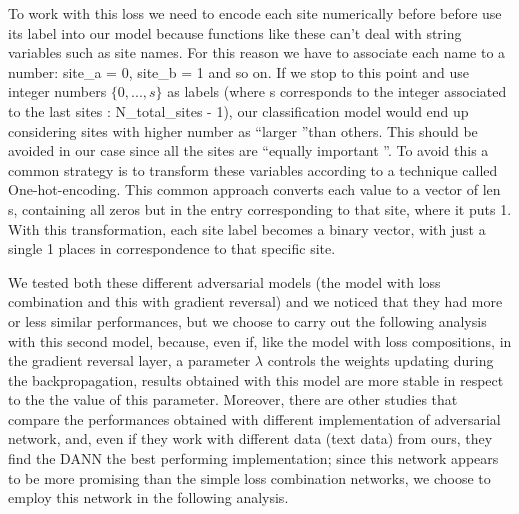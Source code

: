 \documentclass[11pt]{report}
\begin{document}

\begin{notes}
\item To work with this loss we need to encode each site numerically before before use its label into our model because functions like these can't deal with string variables such as site names. For this reason we have to associate each name to a number: site\_a = 0, site\_b = 1 and so on. If we stop to this point and use integer numbers $\{0, ..., s\}$ as labels (where s corresponds to the integer associated to the last sites : N\_total\_sites - 1), our classification model would end up considering sites with higher number as \textquotedblleft larger \textquotedblright than others. This should be avoided in our case since all the sites are \textquotedblleft equally important \textquotedblright. %
To avoid this a common strategy is to transform these variables according to a technique called One-hot-encoding.
This common approach converts each value to a vector of len s, containing all zeros but in the entry corresponding to that site, where it puts 1. With this transformation, each site label becomes a binary vector, with just a single 1 places in correspondence to that specific site.
\end{notes}


We tested both these different adversarial models (the model with loss combination and this with gradient reversal) and we noticed that they had more or less similar performances, but we choose to carry out the following analysis with this second model, because, even if, like the model with loss compositions, in the gradient reversal layer, a parameter $\lambda$ controls the weights updating during the backpropagation, results obtained with this model are more stable in respect to the the value of this parameter.
Moreover, there are other studies \cite{kamath2019} that compare the performances obtained with different implementation of adversarial network, and, even if they work with different data (text data) from ours, they find the DANN the best performing implementation; since this network appears to be more promising than the simple loss combination networks, we choose to employ this network in the following analysis.
\end{document}
